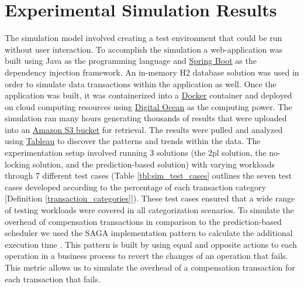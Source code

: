 \section{Experimental Simulation Results}
\label{pbs:experimentation}
The simulation model involved creating a test environment that could be run without user interaction. To accomplish the simulation a web-application was built using Java as the programming language and \href{https://spring.io/projects/spring-boot}{Spring Boot} as the dependency injection framework. An in-memory H2 database solution was used in order to simulate data transactions within the application as well. Once the application was built, it was containerized into a \href{https://www.docker.com/}{Docker} container and deployed on cloud computing resources using \href{https://www.digitalocean.com/}{Digital Ocean} as the computing power. The simulation ran many hours generating thousands of results that were uploaded into an \href{https://aws.amazon.com/s3/}{Amazon S3 bucket} for retrieval. The results were pulled and analyzed using \href{https://www.tableau.com/}{Tableau} to discover the patterns and trends within the data. The experimentation setup involved running 3 solutions (the \gls{2pl} solution, the no-locking solution, and the prediction-based solution) with varying workloads through 7 different test cases (Table \ref{tbl:sim_test_cases} outlines the seven test cases developed according to the percentage of each transaction category [Definition \ref{transaction_categories}]). These test cases ensured that a wide range of testing workloads were covered in all categorization scenarios. To simulate the overhead of compensation transactions in comparison to the prediction-based scheduler we used the SAGA implementation pattern to calculate the additional execution time \cite{SAGAS-Garcaa-Molrna}. This pattern is built by using equal and opposite actions to each operation in a business process to revert the changes of an operation that fails. This metric allows us to simulate the overhead of a compensation transaction for each transaction that fails.

